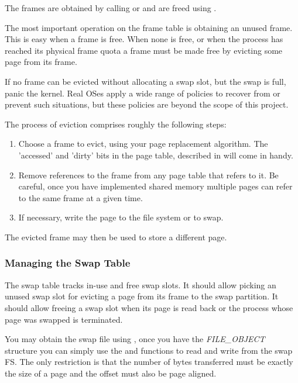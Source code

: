 The frames are obtained by calling  or  and are
freed using .

The most important operation on the frame table is obtaining an unused frame. This is easy when a
frame is free. When none is free, or when the process has reached its physical frame quota a frame
must be made free by evicting some page from its frame.

If no frame can be evicted without allocating a swap slot, but the swap is full, panic the kernel.
Real OSes apply a wide range of policies to recover from or prevent such situations, but these
policies are beyond the scope of this project.

The process of eviction comprises roughly the following steps:
\begin{enumerate}
	\item Choose a frame to evict, using your page replacement algorithm. The 'accessed' and
'dirty' bits in the page table, described in  will come in handy.

	\item Remove references to the frame from any page table that refers to it. Be careful, once you
have implemented shared memory multiple pages can refer to the same frame at a given time.

	\item If necessary, write the page to the file system or to swap.
\end{enumerate}
The evicted frame may then be used to store a different page.

\subsubsection{Managing the Swap Table}
\label{sect:MngSwapTable}

The swap table tracks in-use and free swap slots. It should allow picking an unused swap slot for
evicting a page from its frame to the swap partition. It should allow freeing a swap slot when its
page is read back or the process whose page was swapped is terminated.

You may obtain the swap file using , once you have the \textit{FILE\_OBJECT}
structure you can simply use the  and  functions to read and
write from the swap FS. The only restriction is that the number of bytes transferred must be
exactly the size of a page and the offset must also be page aligned.

